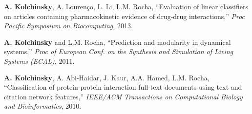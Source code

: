 \textbf{A. Kolchinsky}, A. Lourenço, L. Li, L.M. Rocha, ``Evaluation of linear classifiers on articles containing pharmacokinetic evidence of drug-drug interactions,'' \emph{Proc Pacific Symposium on Biocomputing}, 2013.  

\textbf{A. Kolchinsky} and L.M. Rocha, ``Prediction and modularity in dynamical systems,'' \emph{Proc of European Conf. on the Synthesis and Simulation of Living Systems (ECAL)}, 2011.  

\textbf{A. Kolchinsky}, A. Abi-Haidar, J. Kaur, A.A. Hamed, L.M. Rocha, ``Classification of protein-protein interaction full-text documents using text and citation network features,'' \emph{IEEE/ACM Transactions on Computational Biology and Bioinformatics}, 2010. 
 

